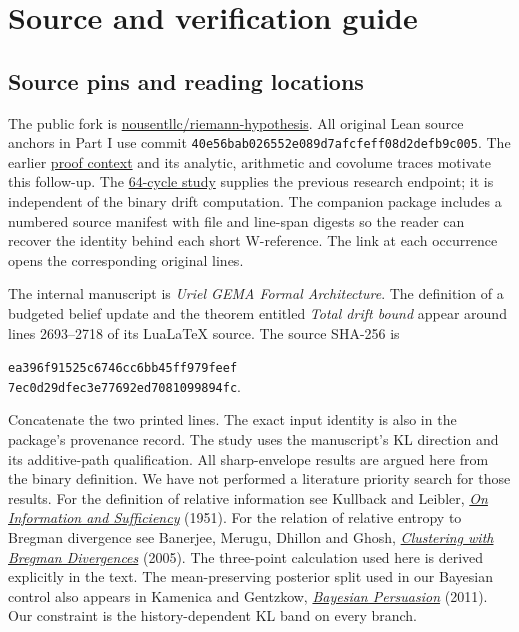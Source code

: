 \documentclass[12pt,letterpaper]{article}
\begin{document}
\appendix
\section{Source and verification guide}
\subsection{Source pins and reading locations}
The public fork is \href{https://github.com/nousentllc/riemann-hypothesis}{\textsf{nousentllc/riemann-hypothesis}}. All original Lean source anchors in Part I use commit \texttt{40e56bab026552e089d7afcfeff08d2defb9c005}. The earlier \href{https://github.com/nousentllc/riemann-hypothesis/blob/08188ff0c6dd02dfec0bd65d30765862e9db56b7/research/uriel/PROOF_CONTEXT.md}{proof context} and its analytic, arithmetic and covolume traces motivate this follow-up. The \href{https://github.com/nousentllc/riemann-hypothesis/pull/15}{64-cycle study} supplies the previous research endpoint; it is independent of the binary drift computation. The companion package includes a numbered source manifest with file and line-span digests so the reader can recover the identity behind each short W-reference. The link at each occurrence opens the corresponding original lines.

The internal manuscript is \emph{Uriel GEMA Formal Architecture}. The definition of a budgeted belief update and the theorem entitled \emph{Total drift bound} appear around lines 2693--2718 of its LuaLaTeX source. The source SHA-256 is
\begin{center}\small\texttt{ea396f91525c6746cc6bb45ff979feef}\\
\texttt{7ec0d29dfec3e77692ed7081099894fc}.\end{center}
Concatenate the two printed lines. The exact input identity is also in the package's provenance record. The study uses the manuscript's KL direction and its additive-path qualification. All sharp-envelope results are argued here from the binary definition. We have not performed a literature priority search for those results. For the definition of relative information see Kullback and Leibler, \href{https://doi.org/10.1214/aoms/1177729694}{\emph{On Information and Sufficiency}} (1951). For the relation of relative entropy to Bregman divergence see Banerjee, Merugu, Dhillon and Ghosh, \href{https://www.jmlr.org/papers/v6/banerjee05b.html}{\emph{Clustering with Bregman Divergences}} (2005). The three-point calculation used here is derived explicitly in the text. The mean-preserving posterior split used in our Bayesian control also appears in Kamenica and Gentzkow, \href{https://doi.org/10.1257/aer.101.6.2590}{\emph{Bayesian Persuasion}} (2011). Our constraint is the history-dependent KL band on every branch.
\end{document}
